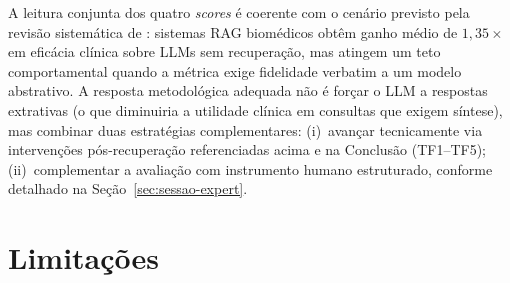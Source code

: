 \documentclass[
  12pt,
  oneside,
  a4paper,
  english,
  brazil
]{abntex2}
\begin{document}
A leitura conjunta dos quatro \emph{scores} é coerente com o cenário
previsto pela revisão sistemática de \citeauthor{ocaf2024}
\cite{ocaf2024}: sistemas RAG biomédicos obtêm ganho médio de
$1{,}35\times$ em eficácia clínica sobre LLMs sem recuperação, mas
atingem um teto comportamental quando a métrica exige fidelidade
verbatim a um modelo abstrativo. A resposta metodológica adequada não
é forçar o LLM a respostas extrativas (o que diminuiria a utilidade
clínica em consultas que exigem síntese), mas combinar duas
estratégias complementares: (i)~avançar tecnicamente via intervenções
pós-recuperação referenciadas acima e na Conclusão (TF1--TF5);
(ii)~complementar a avaliação com instrumento humano estruturado,
conforme detalhado na Seção~\ref{sec:sessao-expert}.

\section{Limitações}
\end{document}
